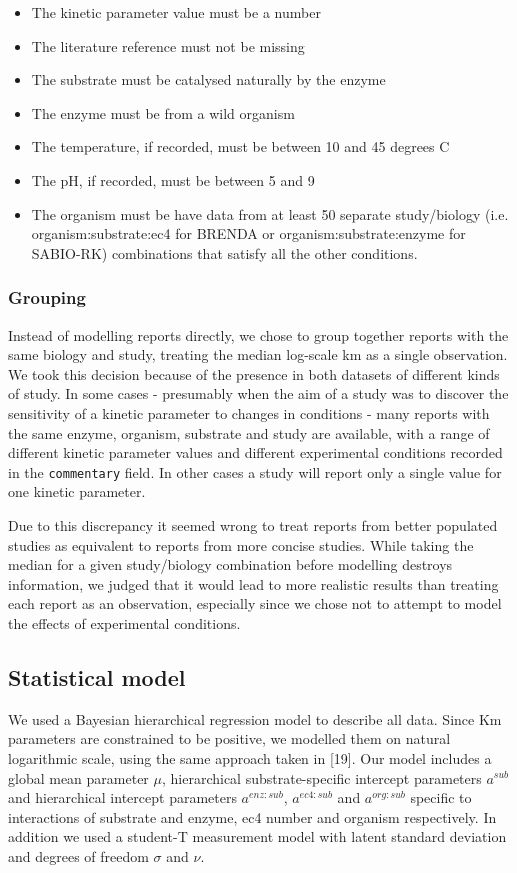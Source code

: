 \documentclass[11pt]{article}
\makeatletter
\newcommand{\citeprocitem}[2]{\hyper@linkstart{cite}{citeproc_bib_item_#1}#2\hyper@linkend}
\makeatother
\begin{document}
\begin{itemize}
\item The kinetic parameter value must be a number
\item The literature reference must not be missing
\item The substrate must be catalysed naturally by the enzyme
\item The enzyme must be from a wild organism
\item The temperature, if recorded, must be between 10 and 45 degrees C
\item The pH, if recorded, must be between 5 and 9
\item The organism must be have data from at least 50 separate study/biology
(i.e. organism:substrate:ec4 for BRENDA or organism:substrate:enzyme for
SABIO-RK) combinations that satisfy all the other conditions.
\end{itemize}

\subsubsection{Grouping}
\label{sec:orge612070}
Instead of modelling reports directly, we chose to group together reports with
the same biology and study, treating the median log-scale km as a single
observation. We took this decision because of the presence in both datasets of
different kinds of study. In some cases - presumably when the aim of a study was
to discover the sensitivity of a kinetic parameter to changes in conditions -
many reports with the same enzyme, organism, substrate and study are available,
with a range of different kinetic parameter values and different experimental
conditions recorded in the \texttt{commentary} field. In other cases a study will
report only a single value for one kinetic parameter.

Due to this discrepancy it seemed wrong to treat reports from better populated
studies as equivalent to reports from more concise studies. While taking the
median for a given study/biology combination before modelling destroys
information, we judged that it would lead to more realistic results than
treating each report as an observation, especially since we chose not to
attempt to model the effects of experimental conditions.

\subsection{Statistical model}
\label{sec:orgec5a53f}
We used a Bayesian hierarchical regression model to describe all data. Since Km
parameters are constrained to be positive, we modelled them on natural
logarithmic scale, using the same approach taken in
\citeprocitem{19}{[19]}. Our model includes a global mean
parameter \(\mu\), hierarchical substrate-specific intercept parameters \(a^{sub}\)
and hierarchical intercept parameters \(a^{enz:sub}\), \(a^{ec4:sub}\) and
\(a^{org:sub}\) specific to interactions of substrate and enzyme, ec4 number and
organism respectively. In addition we used a student-T measurement model with
latent standard deviation and degrees of freedom \(\sigma\) and \(\nu\).
\end{document}
